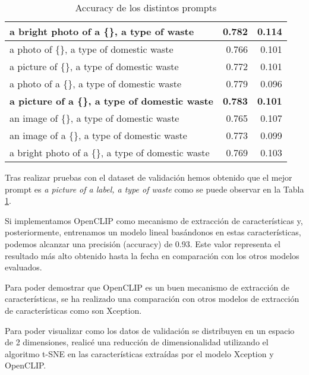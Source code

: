 \documentclass[10pt,a4paper,twocolumn,twoside]{article}
\begin{document}
\begin{table}[h]
\begin{tabular}{@{}lrr@{}}
  a bright photo of a \{\}, a type of waste              & 0.782          & 0.114          \\ 
  \midrule
  a photo of \{\}, a type of domestic waste              & 0.766          & 0.101          \\
  a picture of \{\}, a type of domestic waste            & 0.772          & 0.101          \\
  a photo of a \{\}, a type of domestic waste            & 0.779          & 0.096          \\
  \textbf{a picture of a \{\}, a type of domestic waste} & \textbf{0.783} & \textbf{0.101} \\
  an image of \{\}, a type of domestic waste             & 0.765          & 0.107          \\
  an image of a \{\}, a type of domestic waste           & 0.773          & 0.099          \\
  a bright photo of a \{\}, a type of domestic waste     & 0.769          & 0.103          \\ 
  \bottomrule
  \end{tabular}
  \caption{Accuracy de los distintos prompts}
  \label{tab:my_prompts}
  \end{table}

Tras realizar pruebas con el dataset de validación hemos obtenido que el mejor prompt es \textit{a picture of a \textit{label}, a type of waste} como se puede observar en la Tabla \ref{tab:my_prompts}.

Si implementamos OpenCLIP como mecanismo de extracción de características y, posteriormente, entrenamos un modelo lineal basándonos en estas características, podemos alcanzar una precisión (accuracy) de 0.93. Este valor representa el resultado más alto obtenido hasta la fecha en comparación con los otros modelos evaluados.

Para poder demostrar que OpenCLIP es un buen mecanismo de extracción de características, se ha realizado una comparación con otros modelos de extracción de características como son Xception.

Para poder visualizar como los datos de validación se distribuyen en un espacio de 2 dimensiones, realicé una reducción de dimensionalidad utilizando el algoritmo t-SNE en las características extraídas por el modelo Xception y OpenCLIP.
\end{document}
